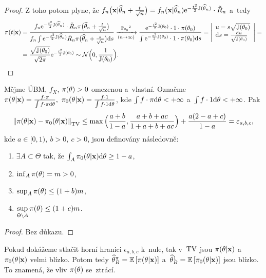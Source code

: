 \begin{dusl}
\begin{proof}
		Z toho potom plyne, že $f_n\big(\textbf{x}|\widehat{\theta}_n+\frac{t}{\sqrt{n}}\big)=f_n(\textbf{x}|\widehat{\theta}_n)\mathrm{e}^{-\frac{t^2}{2}\mathbb{J}(\widehat{\theta}_n)}\cdot\tilde{R}_n$ a~tedy \[
		\begin{split}
		\pi(t|\textbf{x})&=\frac{f_n\e{-\frac{t^2}{2}\mathbb{J}(\htn)}\cdot\tilde{R}_n \pi\big( \htn+\frac{t}{\sqrt{n}} \big)}{f_n\int \e{-\frac{s^2}{2}\mathbb{J}(\htn)}\tilde{R}_n \pi\big(\htn+\frac{s}{\sqrt{n}}\big)\d s}\xrightarrow[(n\rightarrow \infty)]{\PP_{\t_0}\text{\footnotemark}}\frac{\e{-\frac{t^2}{2}\mathbb{J}(\t_0)}\cdot1\cdot \pi(\t_0)}{\int\e{-\frac{s^2}{2}\mathbb{J}(\t_0)}\cdot1\cdot\pi(\t_0)\d s}=\left| \begin{array}{l}
		u=s\sqrt{\mathbb{J}(\t_0)}\\\d s=\frac{\d u}{\sqrt{\mathbb{J}(\t_0)}}		
		\end{array}
		\right|=\\&=\frac{\sqrt{\mathbb{J}(\t_0)}}{\sqrt{2\pi}}\e{-\frac{t^2}{2}\mathbb{J}(\t_0)}\sim\NN\Big( 0,\frac{1}{\mathbb{J}(\t_0)} \Big).
		\end{split}
		\]
	\end{proof}
\end{dusl}
\begin{theorem}
	Mějme ÚBM, $f_X$, $\pi(\theta)>0$ omezenou a~vlastní. Označme $\pi(\theta|\textbf{x})=\frac{f\cdot\pi}{\int f\cdot\pi\mathrm{d}\theta},~\pi_0(\theta|\textbf{x})=\frac{f\cdot1}{\int f\cdot1 \mathrm{d}\theta}$, kde $\int f\cdot\pi\mathrm{d}\theta<+\infty$ a~$\int f\cdot1 \mathrm{d}\theta<+\infty$. Pak
	$$ \left\|\pi(\theta|\textbf{x})-\pi_0(\theta|\textbf{x})\right\|_{\mathrm{TV}}\leq \max\Big(\frac{a+b}{1-a},\frac{a+b+ac}{1+a+b+ac}\Big)+\frac{a(2-a+c)}{1-a}=\varepsilon_{a,b,c},$$
	kde $a\in[0,1),~b>0,~c>0$, jsou definovány následovně:\begin{enumerate}[1)]
		\item $\exists A\subset \Theta$ tak, že $\int_A \pi_0(\theta|\textbf{x})\mathrm{d}\theta\geq 1-a$,
		\item $\inf_A \pi(\theta)=m>0$,
		\item $\sup_A \pi(\theta)\leq (1+b)m$,
		\item $\sup\limits_{\Theta\setminus A} \pi(\theta)\leq(1+c)m$. 
	\end{enumerate}
\end{theorem}
\begin{proof}
Bez důkazu.
\end{proof}
\begin{dusl}
	Pokud dokážeme stlačit horní hranici $\epsilon_{a,b,c}$ k~nule, tak v~$\mathrm{TV}$ jsou $\pi(\theta|\textbf{x})$ a~$\pi_0(\theta|\textbf{x})$ velmi blízko. Potom tedy $\widehat{\theta}_B^\pi=\mathbb{E}\left[ \pi(\theta|\textbf{x}) \right]$ a~$\widehat{\theta}_B^1=\mathbb{E}\left[ \pi_0(\theta|\textbf{x}) \right]$ jsou blízko. To znamená, že vliv $\pi(\theta)$ se~ztrácí.
\end{dusl}\newpage
